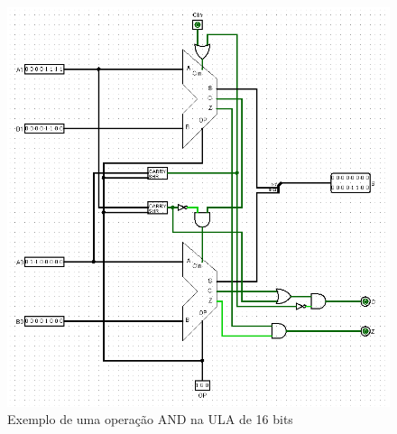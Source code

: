 \documentclass[
	12pt,				%
	openright,			%
	twoside,			%
	a4paper,			%
	english,			%
	french,				%
	spanish,			%
	brazil,				%
	]{abntex2}
\begin{document}
\begin{apendicesenv}
\begin{itemize}
\begin{figure}[H]
	\begin{center}
	    \includegraphics[scale=0.6]{ULA16AND.png}
	\end{center}
\caption{\label{ula16and}Exemplo de uma operação AND na ULA de 16 bits}
\end{figure}


\end{itemize}
\end{apendicesenv}
\end{document}
